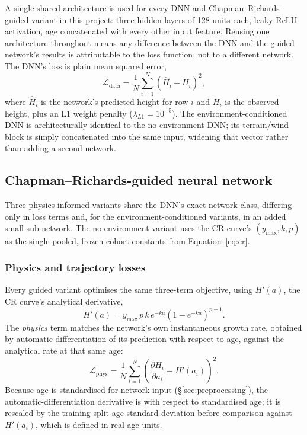 A single shared architecture is used for every DNN and Chapman--Richards-guided variant in this
project: three hidden layers of 128 units each, leaky-ReLU activation, age concatenated with every
other input feature. Reusing one architecture throughout means any difference between the DNN and
the guided network's results is attributable to the loss function, not to a different network. The
DNN's loss is plain mean squared error,
\begin{equation}
\mathcal{L}_{\text{data}} = \frac{1}{N}\sum_{i=1}^{N}\left(\hat H_i - H_i\right)^2,
\label{eq:data-loss}
\end{equation}
where $\hat H_i$ is the network's predicted height for row $i$ and $H_i$ is the observed height,
plus an L1 weight penalty ($\lambda_{L1}=10^{-5}$). The environment-conditioned DNN is
architecturally identical to the no-environment DNN; its terrain/wind block is simply concatenated
into the same input, widening that vector rather than adding a second network.

\subsection{Chapman--Richards-guided neural network}
\label{sec:rq1-pinn}

Three physics-informed variants share the DNN's exact network class, differing only in loss terms
and, for the environment-conditioned variants, in an added small sub-network. The no-environment
variant uses the CR curve's $(y_{\max},k,p)$ as the single pooled, frozen cohort constants from
Equation~\ref{eq:cr}.

\subsubsection{Physics and trajectory losses}
\label{sec:rq1-pinn-loss}

Every guided variant optimises the same three-term objective, using $H'(a)$, the CR curve's
analytical derivative,
\begin{equation}
H'(a) = y_{\max}\,p\,k\,e^{-ka}\left(1-e^{-ka}\right)^{p-1}.
\label{eq:cr-derivative}
\end{equation}
The \emph{physics} term matches the network's own instantaneous growth rate, obtained by automatic
differentiation of its prediction with respect to age, against the analytical rate at that same
age:
\begin{equation}
\mathcal{L}_{\text{phys}} = \frac{1}{N}\sum_{i=1}^{N}\left(\frac{\partial \hat H_i}{\partial a_i} -
H'(a_i)\right)^2.
\label{eq:physics-loss}
\end{equation}
Because age is standardised for network input (\S\ref{sec:preprocessing}), the automatic-differentiation
derivative is with respect to standardised age; it is rescaled by the training-split age standard
deviation before comparison against $H'(a_i)$, which is defined in real age units.


